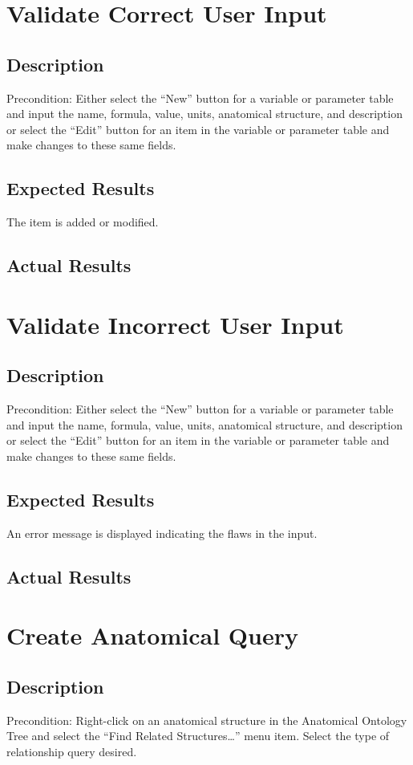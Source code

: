 \documentclass{article}
\begin{document}
\section{Validate Correct User Input}
\subsection{Description}
Precondition: Either select the ``New'' button for a variable or parameter table and input the name, formula, value, units, anatomical structure, and description or select the ``Edit'' button for an item in the variable or parameter table and make changes to these same fields.
\subsection{Expected Results}
The item is added or modified.
\subsection{Actual Results}

\section{Validate Incorrect User Input}
\subsection{Description}
Precondition: Either select the ``New'' button for a variable or parameter table and input the name, formula, value, units, anatomical structure, and description or select the ``Edit'' button for an item in the variable or parameter table and make changes to these same fields.
\subsection{Expected Results}
An error message is displayed indicating the flaws in the input.
\subsection{Actual Results}

\section{Create Anatomical Query}
\subsection{Description}
Precondition: Right-click on an anatomical structure in the Anatomical Ontology Tree and select the ``Find Related Structures\ldots'' menu item. Select the type of relationship query desired.
\end{document}

